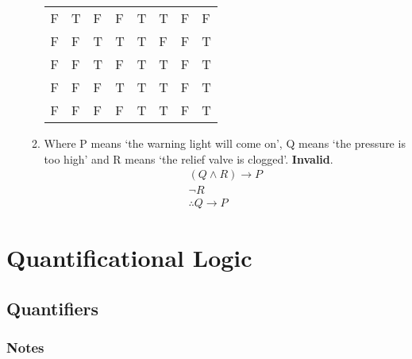 \documentclass[a4paper, 11pt]{article}
\begin{document}
\begin{enumerate}
\begin{enumerate}
\begin{table}[htbp]
\begin{tabular}{llllllll}
                    F & T & F & F & T                          & T                      & F            & F        \\
                    F & F & T & T & T                          & F                      & F            & T        \\
                    F & F & T & F & T                          & T                      & F            & T        \\
                    F & F & F & T & T                          & T                      & F            & T        \\
                    F & F & F & F & T                          & T                      & F            & T        \\
                  \end{tabular}%
                \end{table}%

          \item Where P means `the warning light will come on', Q means `the pressure is too high' and R means `the relief valve is clogged'. \textbf{Invalid}.
                \begin{align*}
                  (Q \wedge R) \rightarrow P \\ \neg R \\ \therefore Q \rightarrow P
                \end{align*}
        \end{enumerate}
\end{enumerate}
\clearpage

\section{Quantificational Logic}

\subsection{Quantifiers}
\subsubsection{Notes}
\end{document}
